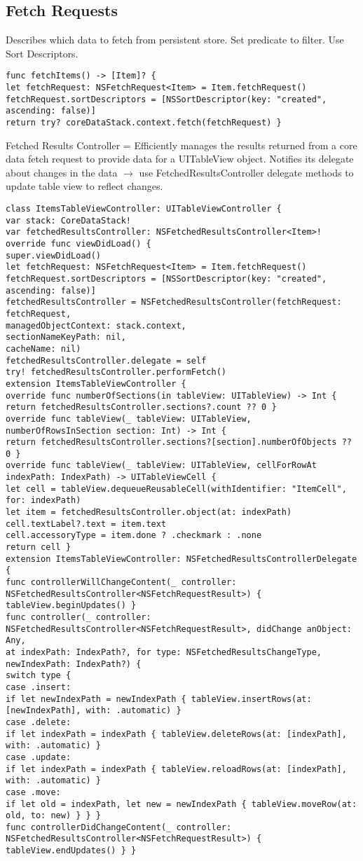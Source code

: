 \subsection{Fetch Requests}
Describes which data to fetch from persistent store. Set predicate to filter. Use Sort Descriptors.
\begin{lstlisting}
func fetchItems() -> [Item]? {
let fetchRequest: NSFetchRequest<Item> = Item.fetchRequest()
fetchRequest.sortDescriptors = [NSSortDescriptor(key: "created", ascending: false)]
return try? coreDataStack.context.fetch(fetchRequest) }
\end{lstlisting}
Fetched Results Controller = Efficiently manages the results returned from a core data fetch request to provide data for a UITableView object. Notifies its delegate about changes in the data $\rightarrow$ use FetchedResultsController delegate methods to update table view to reflect changes.
\begin{lstlisting}
class ItemsTableViewController: UITableViewController {
var stack: CoreDataStack!
var fetchedResultsController: NSFetchedResultsController<Item>!
override func viewDidLoad() {
super.viewDidLoad()
let fetchRequest: NSFetchRequest<Item> = Item.fetchRequest()
fetchRequest.sortDescriptors = [NSSortDescriptor(key: "created", ascending: false)]
fetchedResultsController = NSFetchedResultsController(fetchRequest: fetchRequest,
managedObjectContext: stack.context,
sectionNameKeyPath: nil,
cacheName: nil)
fetchedResultsController.delegate = self
try! fetchedResultsController.performFetch()
extension ItemsTableViewController {
override func numberOfSections(in tableView: UITableView) -> Int {
return fetchedResultsController.sections?.count ?? 0 }
override func tableView(_ tableView: UITableView, numberOfRowsInSection section: Int) -> Int {
return fetchedResultsController.sections?[section].numberOfObjects ?? 0 }
override func tableView(_ tableView: UITableView, cellForRowAt indexPath: IndexPath) -> UITableViewCell {
let cell = tableView.dequeueReusableCell(withIdentifier: "ItemCell", for: indexPath)
let item = fetchedResultsController.object(at: indexPath)
cell.textLabel?.text = item.text
cell.accessoryType = item.done ? .checkmark : .none
return cell }
extension ItemsTableViewController: NSFetchedResultsControllerDelegate {
func controllerWillChangeContent(_ controller: NSFetchedResultsController<NSFetchRequestResult>) {
tableView.beginUpdates() }
func controller(_ controller: NSFetchedResultsController<NSFetchRequestResult>, didChange anObject: Any,
at indexPath: IndexPath?, for type: NSFetchedResultsChangeType, newIndexPath: IndexPath?) {
switch type {
case .insert:
if let newIndexPath = newIndexPath { tableView.insertRows(at: [newIndexPath], with: .automatic) }
case .delete:
if let indexPath = indexPath { tableView.deleteRows(at: [indexPath], with: .automatic) }
case .update:
if let indexPath = indexPath { tableView.reloadRows(at: [indexPath], with: .automatic) }
case .move:
if let old = indexPath, let new = newIndexPath { tableView.moveRow(at: old, to: new) } } }
func controllerDidChangeContent(_ controller: NSFetchedResultsController<NSFetchRequestResult>) {
tableView.endUpdates() } }
\end{lstlisting}

